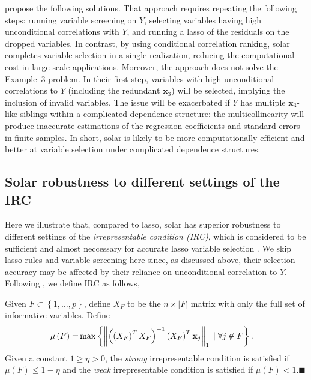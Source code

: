 \documentclass[11pt,review,authoryear]{elsarticle}
\begin{document}
\citet{fan2008sure} propose the following solutions. That approach requires repeating the following steps: running variable screening on $Y$, selecting variables having high unconditional correlations with $Y$, and running a lasso of the residuals on the dropped variables. In contrast, by using conditional correlation ranking, solar completes variable selection in a single realization, reducing the computational cost in large-scale applications. Moreover, the \citet{fan2008sure} approach does not solve the Example~3 problem. In their first step, variables with high unconditional correlations to $Y$ (including the redundant $\mathbf{x}_3$) will be selected, implying the inclusion of invalid variables. The issue will be exacerbated if $Y$ has multiple $\mathbf{x}_3$-like siblings within a complicated dependence structure: the multicollinearity will produce inaccurate estimations of the regression coefficients and standard errors in finite samples. In short, solar is likely to be more computationally efficient and better at variable selection under complicated dependence structures.


\subsection{Solar robustness to different settings of the IRC \label{subsection:irc}}

Here we illustrate that, compared to lasso, solar has superior robustness to different settings of the \emph{irrepresentable condition (IRC)}, which is considered to be sufficient and almost neccessary for accurate lasso variable selection \citep{zhang09}. We skip lasso rules and variable screening here since, as discussed above, their selection accuracy may be affected by their reliance on unconditional correlation to $Y$. Following \citet{zhang09}, we define IRC as follows,

\begin{definition}[IRC]
  Given $F \subset \left\{ 1, \ldots, p \right\}$, define $X_F$ to be the $n \times \left\vert F \right \vert$ matrix with only the full set of informative variables. Define
    \begin{align}
    \mu \left( F \right) = & \max \left\{ \left\Vert \left( \left( X_F \right)^T X_F \right)^{-1} \left( X_F \right)^T \mathbf{x}_j \right\Vert_1 \; \vert \; \forall j \not\in F \right\}. \notag
    \end{align}
  Given a constant $1 \geqslant \eta > 0$, the \emph{strong} irrepresentable condition is satisfied if $\mu \left( F \right) \leqslant 1 - \eta$ and the \emph{weak} irrepresentable condition is satisfied if $\mu \left( F \right) < 1$.$\blacksquare$
\end{definition}
\end{document}
